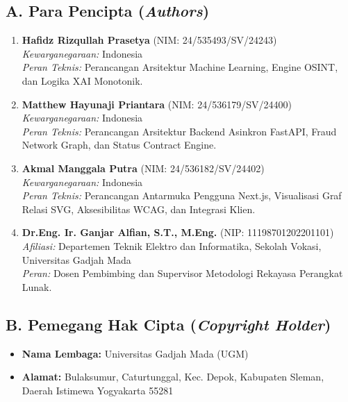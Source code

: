 \documentclass[11pt,a4paper]{article}
\begin{document}
\subsection*{A. Para Pencipta (\textit{Authors})}
\begin{enumerate}
    \item \textbf{Hafidz Rizqullah Prasetya} (NIM: 24/535493/SV/24243) \\
    \textit{Kewarganegaraan:} Indonesia \\
    \textit{Peran Teknis:} Perancangan Arsitektur Machine Learning, Engine OSINT, dan Logika XAI Monotonik.
    
    \item \textbf{Matthew Hayunaji Priantara} (NIM: 24/536179/SV/24400) \\
    \textit{Kewarganegaraan:} Indonesia \\
    \textit{Peran Teknis:} Perancangan Arsitektur Backend Asinkron FastAPI, Fraud Network Graph, dan Status Contract Engine.
    
    \item \textbf{Akmal Manggala Putra} (NIM: 24/536182/SV/24402) \\
    \textit{Kewarganegaraan:} Indonesia \\
    \textit{Peran Teknis:} Perancangan Antarmuka Pengguna Next.js, Visualisasi Graf Relasi SVG, Aksesibilitas WCAG, dan Integrasi Klien.
    
    \item \textbf{Dr.Eng. Ir. Ganjar Alfian, S.T., M.Eng.} (NIP: 11198701202201101) \\
    \textit{Afiliasi:} Departemen Teknik Elektro dan Informatika, Sekolah Vokasi, Universitas Gadjah Mada \\
    \textit{Peran:} Dosen Pembimbing dan Supervisor Metodologi Rekayasa Perangkat Lunak.
\end{enumerate}

\subsection*{B. Pemegang Hak Cipta (\textit{Copyright Holder})}
\begin{itemize}
    \item \textbf{Nama Lembaga:} Universitas Gadjah Mada (UGM)
    \item \textbf{Alamat:} Bulaksumur, Caturtunggal, Kec. Depok, Kabupaten Sleman, Daerah Istimewa Yogyakarta 55281
\end{itemize}
\end{document}
